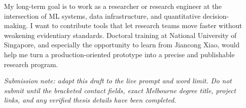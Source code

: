 \documentclass[11pt]{article}
\begin{document}
My long-term goal is to work as a researcher or research engineer at the intersection of ML systems, data infrastructure, and quantitative decision-making. I want to contribute tools that let research teams move faster without weakening evidentiary standards. Doctoral training at National University of Singapore, and especially the opportunity to learn from Jiancong Xiao, would help me turn a production-oriented prototype into a precise and publishable research program.

\textit{Submission note: adapt this draft to the live prompt and word limit. Do not submit until the bracketed contact fields, exact Melbourne degree title, project links, and any verified thesis details have been completed.}
\end{document}
